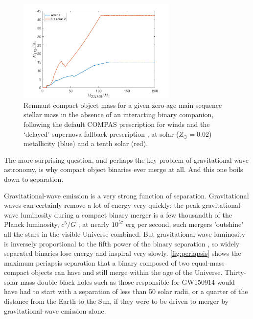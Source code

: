 \documentclass[iop,onecolumn]{revtex4}
\newcommand{\todo}[1]{\textcolor{red}{#1}}
\begin{document}
\begin{figure}
	\centering
	\includegraphics[width=0.7\textwidth]{BHremnantdelayed.png}
	\caption{\label{fig:BHremnant} Remnant compact object mass for a given zero-age main sequence stellar mass in the absence of an interacting binary companion, following the default COMPAS prescription for winds \citep{Stevenson:2017}  and the `delayed' supernova fallback prescription \citep{Fryer:2012}, at solar ($Z_\odot=0.02$) metallicity (blue) and a tenth solar (red).}
\end{figure}

The more surprising question, and perhaps the key problem of gravitational-wave astronomy, is why compact object binaries ever merge at all.  And this one boils down to separation.  

Gravitational-wave emission is a very strong function of separation.  Gravitational waves can certainly remove a lot of energy very quickly: the peak gravitational-wave luminosity during a compact binary merger is a few thousandth of the Planck luminosity, $c^5/G$ \citep[e.g.,][]{Cardoso:2018}; at nearly $10^{57}$ erg per second, such mergers 'outshine' all the stars in the visible Universe combined.  But gravitational-wave luminosity is inversely proportional to the fifth power of the binary separation \citep{Peters:1964}, so widely separated binaries lose energy and inspiral very slowly.  \autoref{fig:periapsis} shows the maximum periapsis separation that a binary composed of two equal-mass compact objects can have and still merge within the age of the Universe.  Thirty-solar mass double black holes such as those responsible for GW150914 would have had to start with a separation of less than 50 solar radii, or a quarter of the distance from the Earth to the Sun, if they were to be driven to merger by gravitational-wave emission alone.
\end{document}
